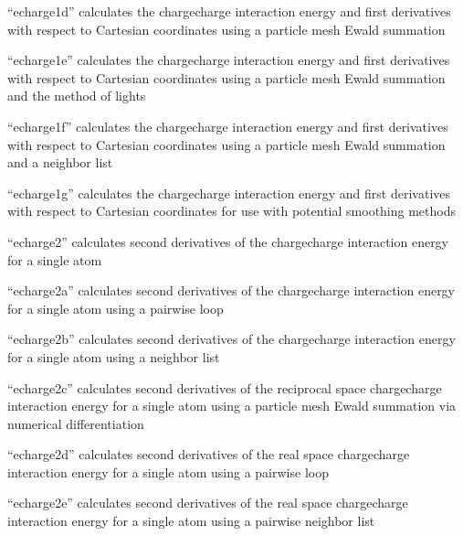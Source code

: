 \documentclass[letterpaper,11pt,english]{sphinxmanual}
\begin{document}
“echarge1d” calculates the charge\sphinxhyphen{}charge interaction energy
and first derivatives with respect to Cartesian coordinates
using a particle mesh Ewald summation


“echarge1e” calculates the charge\sphinxhyphen{}charge interaction energy
and first derivatives with respect to Cartesian coordinates
using a particle mesh Ewald summation and the method of lights


“echarge1f” calculates the charge\sphinxhyphen{}charge interaction energy
and first derivatives with respect to Cartesian coordinates
using a particle mesh Ewald summation and a neighbor list


“echarge1g” calculates the charge\sphinxhyphen{}charge interaction energy
and first derivatives with respect to Cartesian coordinates
for use with potential smoothing methods


“echarge2” calculates second derivatives of the
charge\sphinxhyphen{}charge interaction energy for a single atom


“echarge2a” calculates second derivatives of the charge\sphinxhyphen{}charge
interaction energy for a single atom using a pairwise loop


“echarge2b” calculates second derivatives of the charge\sphinxhyphen{}charge
interaction energy for a single atom using a neighbor list


“echarge2c” calculates second derivatives of the reciprocal
space charge\sphinxhyphen{}charge interaction energy for a single atom using
a particle mesh Ewald summation via numerical differentiation


“echarge2d” calculates second derivatives of the real space
charge\sphinxhyphen{}charge interaction energy for a single atom using a
pairwise loop


“echarge2e” calculates second derivatives of the real space
charge\sphinxhyphen{}charge interaction energy for a single atom using a
pairwise neighbor list
\end{document}
